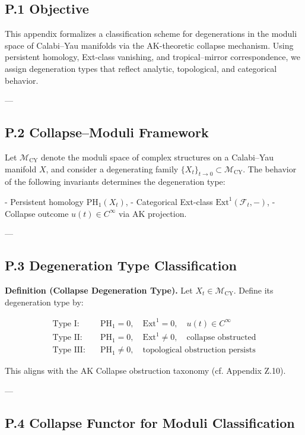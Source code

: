 \documentclass[11pt]{article}
\begin{document}
\begin{axiom}
\begin{axiom}
{{\subsection*{P.1 Objective}

This appendix formalizes a classification scheme for degenerations in the moduli space of Calabi–Yau manifolds  
via the AK-theoretic collapse mechanism. Using persistent homology, Ext-class vanishing, and tropical–mirror correspondence,  
we assign degeneration types that reflect analytic, topological, and categorical behavior.

---

\subsection*{P.2 Collapse–Moduli Framework}

Let \( \mathcal{M}_{\mathrm{CY}} \) denote the moduli space of complex structures on a Calabi–Yau manifold \( X \),  
and consider a degenerating family \( \{X_t\}_{t \to 0} \subset \mathcal{M}_{\mathrm{CY}} \). The behavior of the following invariants determines the degeneration type:

- Persistent homology \( \mathrm{PH}_1(X_t) \),
- Categorical Ext-class \( \mathrm{Ext}^1(\mathcal{F}_t, -) \),
- Collapse outcome \( u(t) \in C^\infty \) via AK projection.

---

\subsection*{P.3 Degeneration Type Classification}

\textbf{Definition (Collapse Degeneration Type).}  
Let \( X_t \in \mathcal{M}_{\mathrm{CY}} \). Define its degeneration type by:

\[
\begin{aligned}
\text{Type I:} &\quad \mathrm{PH}_1 = 0,\quad \mathrm{Ext}^1 = 0,\quad u(t) \in C^\infty \\
\text{Type II:} &\quad \mathrm{PH}_1 = 0,\quad \mathrm{Ext}^1 \neq 0,\quad \text{collapse obstructed} \\
\text{Type III:} &\quad \mathrm{PH}_1 \neq 0,\quad \text{topological obstruction persists}
\end{aligned}
\]

This aligns with the AK Collapse obstruction taxonomy (cf. Appendix Z.10).

---

\subsection*{P.4 Collapse Functor for Moduli Classification}

}}
\end{axiom}
\end{axiom}
\end{document}
